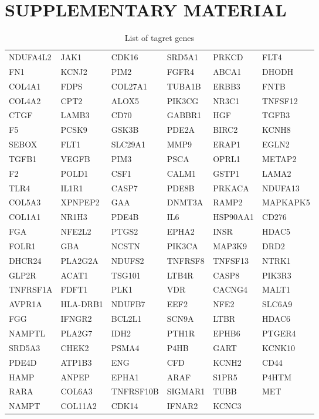 \documentclass[fleqn,10pt]{SelfArx} %
\begin{document}

\pagebreak
\onecolumn

\section*{SUPPLEMENTARY MATERIAL}



\begin{table}[ht]
	\centering
	\begin{tabularx}{\textwidth}{XXXXXX}
		NDUFA4L2 & JAK1 & CDK16 & SRD5A1 & PRKCD & FLT4 \\ 
		FN1 & KCNJ2 & PIM2 & FGFR4 & ABCA1 & DHODH \\ 
		COL4A1 & FDPS & COL27A1 & TUBA1B & ERBB3 & FNTB \\ 
		COL4A2 & CPT2 & ALOX5 & PIK3CG & NR3C1 & TNFSF12 \\ 
		CTGF & LAMB3 & CD70 & GABBR1 & HGF & TGFB3 \\ 
		F5 & PCSK9 & GSK3B & PDE2A & BIRC2 & KCNH8 \\ 
		SEBOX & FLT1 & SLC29A1 & MMP9 & ERAP1 & EGLN2 \\ 
		TGFB1 & VEGFB & PIM3 & PSCA & OPRL1 & METAP2 \\ 
		F2 & POLD1 & CSF1 & CALM1 & GSTP1 & LAMA2 \\ 
		TLR4 & IL1R1 & CASP7 & PDE8B & PRKACA & NDUFA13 \\ 
		COL5A3 & XPNPEP2 & GAA & DNMT3A & RAMP2 & MAPKAPK5 \\ 
		COL1A1 & NR1H3 & PDE4B & IL6 & HSP90AA1 & CD276 \\ 
		FGA & NFE2L2 & PTGS2 & EPHA2 & INSR & HDAC5 \\ 
		FOLR1 & GBA & NCSTN & PIK3CA & MAP3K9 & DRD2 \\ 
		DHCR24 & PLA2G2A & NDUFS2 & TNFRSF8 & TNFSF13 & NTRK1 \\ 
		GLP2R & ACAT1 & TSG101 & LTB4R & CASP8 & PIK3R3 \\ 
		TNFRSF1A & FDFT1 & PLK1 & VDR & CACNG4 & MALT1 \\ 
		AVPR1A & HLA-DRB1 & NDUFB7 & EEF2 & NFE2 & SLC6A9 \\ 
		FGG & IFNGR2 & BCL2L1 & SCN9A & LTBR & HDAC6 \\ 
		NAMPTL & PLA2G7 & IDH2 & PTH1R & EPHB6 & PTGER4 \\ 
		SRD5A3 & CHEK2 & PSMA4 & P4HB & GART & KCNK10 \\ 
		PDE4D & ATP1B3 & ENG & CFD & KCNH2 & CD44 \\ 
		HAMP & ANPEP & EPHA1 & ARAF & S1PR5 & P4HTM \\ 
		RARA & COL6A3 & TNFRSF10B & SIGMAR1 & TUBB & MET \\ 
		NAMPT & COL11A2 & CDK14 & IFNAR2 & KCNC3 &  \\ 
	\end{tabularx}
	\smallskip
	\caption{List of tagret genes}
	\label{tab:194genes}
\end{table}
\end{document}

